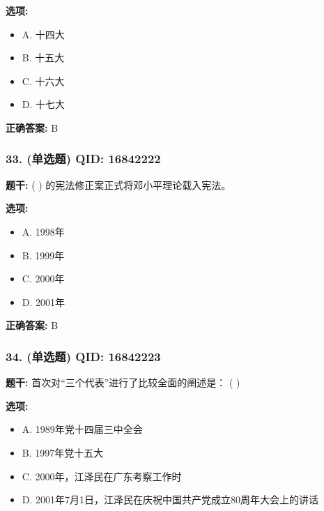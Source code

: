 \documentclass[12pt,UTF8]{ctexart}
\begin{document}
\textbf{选项:}
\begin{itemize}[leftmargin=*]

  \item A. 十四大

  \item B. 十五大

  \item C. 十六大

  \item D. 十七大

\end{itemize}

\textbf{正确答案:}
B

\vspace{0.3em}\hrulefill\vspace{0.7em}

\subsubsection*{33. (单选题) \small QID: 16842222}

\textbf{题干:}
( ) 的宪法修正案正式将邓小平理论载入宪法。

\textbf{选项:}
\begin{itemize}[leftmargin=*]

  \item A. 1998年

  \item B. 1999年

  \item C. 2000年

  \item D. 2001年

\end{itemize}

\textbf{正确答案:}
B

\vspace{0.3em}\hrulefill\vspace{0.7em}

\subsubsection*{34. (单选题) \small QID: 16842223}

\textbf{题干:}
首次对“三个代表”进行了比较全面的阐述是： ( )

\textbf{选项:}
\begin{itemize}[leftmargin=*]

  \item A. 1989年党十四届三中全会

  \item B. 1997年党十五大

  \item C. 2000年，江泽民在广东考察工作时

  \item D. 2001年7月1日，江泽民在庆祝中国共产党成立80周年大会上的讲话

\end{itemize}
\end{document}
